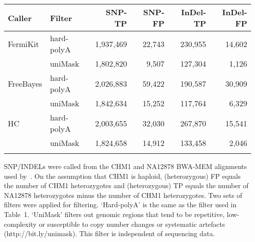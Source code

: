 \documentclass{bioinfo}
\begin{document}
\begin{table}[t]
{\footnotesize
\begin{tabular}{llrrrr}
\toprule
Caller   & Filter     & SNP-TP    & SNP-FP & InDel-TP & InDel-FP \\
\midrule
FermiKit & hard-polyA & 1,937,469 & 22,743 & 230,955 & 14,602 \\
         & uniMask    & 1,802,820 & 9,507  & 127,304 & 1,126 \\
FreeBayes& hard-polyA & 2,026,883 & 59,422 & 190,587 & 30,909 \\
         & uniMask    & 1,842,634 & 15,252 & 117,764 & 6,329 \\
HC       & hard-polyA & 2,003,655 & 32,030 & 267,870 & 15,541 \\
         & uniMask    & 1,824,658 & 14,912 & 133,458 & 2,046 \\
\botrule
\end{tabular}}{SNP/INDELs were called from the CHM1 and NA12878 BWA-MEM
alignments used by~\citet{Li:2014aa}. On the assumption that CHM1 is haploid,
(heterozygous) FP equals the number of CHM1 heterozygotes and (heterozygous) TP
equals the number of NA12878 heterozygotes minus the number of CHM1
heterozygotes. Two sets of filters were applied for filtering. `Hard-polyA' is
the same as the filter used in Table~1.  `UniMask' filters out genomic regions
that tend to be repetitive, low-complexity or susceptible to copy number
changes or systematic artefacts (http://bit.ly/unimask). This filter is
independent of sequencing data.}
\end{table}
\end{document}
